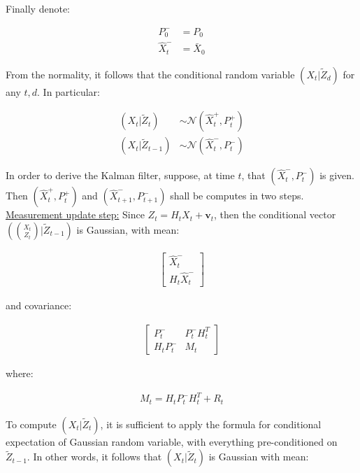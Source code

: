 \documentclass{pracamgr}
\numberwithin{equation}{section}
\begin{document}
Finally denote:

\begin{align}
P_{0}^{-} &= P_{0} \\
\hat{X}_{t}^{-} &= \bar{X}_{0}
\end{align}

From the normality, it follows that the conditional random variable $(X_{t} | \tilde{Z}_{d})$ for any $t, d$. In particular:

\begin{align}
(X_{t} | \tilde{Z}_{t}) &\sim   \mathcal{N} \left(\hat{X}_{t}^{+}, P_{t}^{+} \right) \\
(X_{t} | \tilde{Z}_{t-1}) &\sim  \mathcal{N} \left(\hat{X}_{t}^{-}, P_{t}^{-} \right)
\end{align}

In order to derive the Kalman filter, suppose, at time $t$, that $\left(\hat{X}_{t}^{-}, P_{t}^{-} \right)$ is given. Then $\left(\hat{X}_{t}^{+}, P_{t}^{+} \right)$ and $\left(\hat{X}_{t+1}^{-}, P_{t+1}^{-} \right)$ shall be computes in two steps. \\

\underline{Measurement update step:} Since $Z_{t} = H_{t} X_{t} + \mathbf{v}_{t}$, then the conditional vector $\left( \binom{X_{t}}{Z_{t}}  | \tilde{Z}_{t-1} \right)$ is Gaussian, with mean:

\begin{align}
\left[\begin{array}{c}
\hat{X}_{t}^{-} \\
H_{t} \hat{X}_{t}^{-}
\end{array}\right]
\end{align}

and covariance:

\begin{align}
\left[\begin{array}{cc}
P_{t}^{-} & P_{t}^{-}H_{t}^{T} \\
H_{t}P_{t}^{-} & M_{t}
\end{array}\right]
\end{align}

where:

\begin{align}
M_{t} = H_{t} P_{t}^{-} H_{t}^{T} + R_{t}
\end{align}

To compute $\left(X_{t} |  \tilde{Z}_{t} \right)$, it is sufficient to apply the formula for conditional expectation of Gaussian random variable, with everything pre-conditioned on $\tilde{Z}_{t-1}$. In other words, it follows that $\left(X_{t} |  \tilde{Z}_{t} \right)$ is Gaussian with mean:
\end{document}
